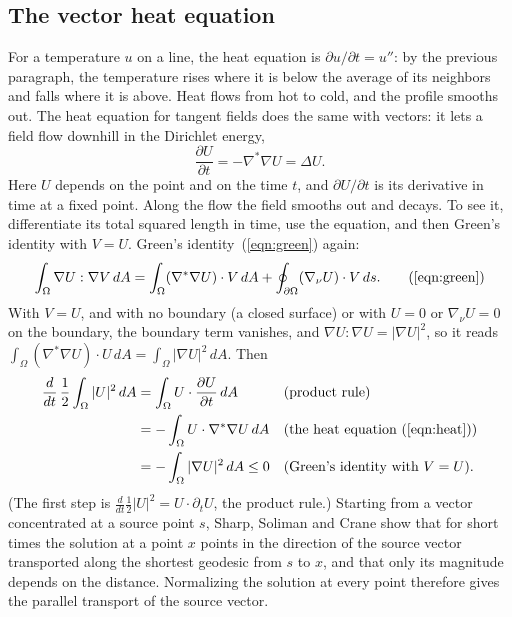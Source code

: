 \subsection{The vector heat equation}

For a temperature $u$ on a line, the heat equation is $\partial u/\partial t = u''$: by the previous paragraph, the temperature rises where it is below the average of its neighbors and falls where it is above. Heat flows from hot to cold, and the profile smooths out. The heat equation for tangent fields does the same with vectors: it lets a field flow downhill in the Dirichlet energy,
\begin{equation}
\label{eqn:heat}
\frac{\partial U}{\partial t} = -\nabla^* \nabla U = \Delta U .
\end{equation}
Here $U$ depends on the point and on the time $t$, and $\partial U/\partial t$ is its derivative in time at a fixed point. Along the flow the field smooths out and decays. To see it, differentiate its total squared length in time, use the equation, and then Green's identity with $V = U$. Green's identity~(\ref{eqn:green}) again:
\begin{equation*}
\int_\Omega \nabla U : \nabla V\, dA = \int_\Omega (\nabla^* \nabla U) \cdot V\, dA + \oint_{\partial \Omega} (\nabla_\nu U) \cdot V\, ds. \tag{\ref{eqn:green}}
\end{equation*}
With $V = U$, and with no boundary (a closed surface) or with $U = 0$ or $\nabla_\nu U = 0$ on the boundary, the boundary term vanishes, and $\nabla U : \nabla U = |\nabla U|^2$, so it reads $\int_\Omega (\nabla^*\nabla U)\cdot U\, dA = \int_\Omega |\nabla U|^2\, dA$. Then
\begin{align*}
\frac{d}{dt}\, \frac12 \int_\Omega |U|^2\, dA &= \int_\Omega U \cdot \frac{\partial U}{\partial t}\, dA && \text{(product rule)} \\
&= -\int_\Omega U \cdot \nabla^*\nabla U\, dA && \text{(the heat equation~(\ref{eqn:heat}))} \\
&= -\int_\Omega |\nabla U|^2\, dA \leq 0 && \text{(Green's identity with } V = U\text{)}.
\end{align*}
(The first step is $\frac{d}{dt}\frac12 |U|^2 = U\cdot\partial_t U$, the product rule.) Starting from a vector concentrated at a source point $s$, Sharp, Soliman and Crane \cite{Sharp2019} show that for short times the solution at a point $x$ points in the direction of the source vector transported along the shortest geodesic from $s$ to $x$, and that only its magnitude depends on the distance. Normalizing the solution at every point therefore gives the parallel transport of the source vector.

